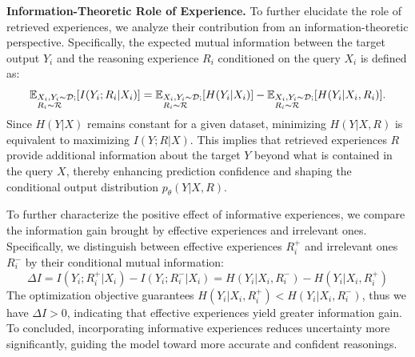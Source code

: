 \documentclass{article}
\begin{document}
\textbf{Information-Theoretic Role of Experience.}
To further elucidate the role of retrieved experiences, we analyze their contribution from an information-theoretic perspective.
Specifically, the expected mutual information between the target output $Y_i$ and the reasoning experience $R_i$ conditioned on the query $X_i$ is defined as:
\begin{equation}
\mathbb{E}_{\begin{subarray}{l}
X_i,Y_i\sim\mathcal{D};\\
R_i\sim\mathcal{R}
\end{subarray}}[I(Y_i;R_i|X_i)] = \mathbb{E}_{\begin{subarray}{l}
X_i,Y_i\sim\mathcal{D};\\
R_i\sim\mathcal{R}
\end{subarray}}[H(Y_i|X_i)] - \mathbb{E}_{\begin{subarray}{l}
X_i,Y_i\sim\mathcal{D};\\
R_i\sim\mathcal{R}
\end{subarray}}[H(Y_i|X_i,R_i)].
\end{equation}
Since $H(Y|X)$ remains constant for a given dataset, minimizing $H(Y|X,R)$ is equivalent to maximizing $I(Y;R|X)$. 
This implies that retrieved experiences $R$ provide additional information about the target $Y$ beyond what is contained in the query $X$, thereby enhancing prediction confidence and shaping the conditional output distribution $p_\theta(Y|X,R)$.

To further characterize the positive effect of informative experiences, we compare the information gain brought by effective experiences and irrelevant ones. 
Specifically, we distinguish between effective experiences $R_i^+$ and irrelevant ones $R_i^-$ by their conditional mutual information:
\begin{equation}
\Delta I = I(Y_i;R_i^+|X_i) - I(Y_i;R_i^-|X_i) = H(Y_i|X_i,R_i^-) - H(Y_i|X_i,R_i^+)
\end{equation}
The optimization objective guarantees $H(Y_i|X_i,R_i^+) < H(Y_i|X_i,R_i^-)$, thus we have $\Delta I > 0$, indicating that effective experiences yield greater information gain.
To concluded, incorporating informative experiences reduces uncertainty more significantly, guiding the model toward more accurate and confident reasonings.
\end{document}
